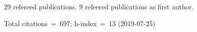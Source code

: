 29 refereed publications. 9 refeered publications as first author.

Total citations~=~697; h-index~=~13 (2019-07-25)